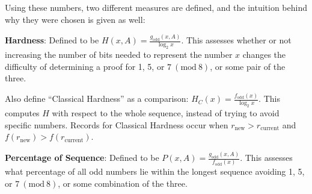 \documentclass[12pt]{article}
\newcommand{\Mod}[1]{\ (\mathrm{mod}\ #1)}
\theoremstyle{definition}
\begin{document}
Using these numbers, two different measures are defined, and the intuition behind why they were chosen is given as well: \par
\textbf{Hardness}: Defined to be $H(x,A) = \frac{g_\text{odd}(x,A)}{\log_2{x}}$. This assesses whether or not increasing the number of bits needed to represent the number $x$ changes the difficulty of determining a proof for 1, 5, or $7\Mod{8}$, or some pair of the three.  \par
Also define ``Classical Hardness'' as a comparison: $H_C(x) = \frac{f_\text{odd}(x)}{\log_2{x}}$. This computes $H$ with respect to the whole sequence, instead of trying to avoid specific numbers. Records for Classical Hardness occur when $r_\text{new} > r_\text{current}$ and $f(r_\text{new}) > f(r_\text{current})$. \par
\textbf{Percentage of Sequence}: Defined to be $P(x,A) = \frac{g_\text{odd}(x,A)}{f_\text{odd}(x)}$. This assesses what percentage of all odd numbers lie within the longest sequence avoiding 1, 5, or $7\Mod{8}$, or some combination of the three.
\end{document}
